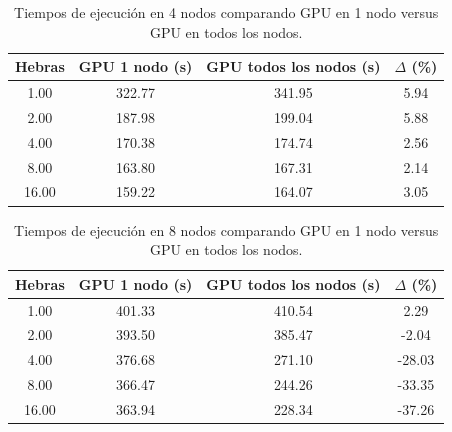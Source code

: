 \begin{table}[ht]
    \centering
    \begin{tabular}{c|ccc}
        Hebras & GPU 1 nodo (s) & GPU todos los nodos (s) & $\Delta$ (\%) \\
        \hline
        1.00   & 322.77         & 341.95                  & 5.94          \\
        2.00   & 187.98         & 199.04                  & 5.88          \\
        4.00   & 170.38         & 174.74                  & 2.56          \\
        8.00   & 163.80         & 167.31                  & 2.14          \\
        16.00  & 159.22         & 164.07                  & 3.05          \\
    \end{tabular}
    \caption{Tiempos de ejecución en 4 nodos comparando GPU en 1 nodo versus GPU en todos los nodos.}
    \label{tab:gpu_4nodes}
\end{table}

\begin{table}[ht]
    \centering
    \begin{tabular}{c|ccc}
        Hebras & GPU 1 nodo (s) & GPU todos los nodos (s) & $\Delta$ (\%) \\
        \hline
        1.00   & 401.33         & 410.54                  & 2.29          \\
        2.00   & 393.50         & 385.47                  & -2.04         \\
        4.00   & 376.68         & 271.10                  & -28.03        \\
        8.00   & 366.47         & 244.26                  & -33.35        \\
        16.00  & 363.94         & 228.34                  & -37.26        \\
    \end{tabular}
    \caption{Tiempos de ejecución en 8 nodos comparando GPU en 1 nodo versus GPU en todos los nodos.}
    \label{tab:gpu_8nodes}
\end{table}

